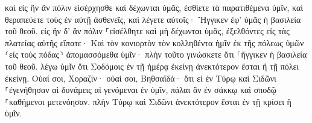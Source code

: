 \documentclass{openreader}
\begin{document}
καὶ εἰς ἣν ἂν πόλιν εἰσέρχησθε καὶ δέχωνται ὑμᾶς, ἐσθίετε τὰ παρατιθέμενα ὑμῖν, 
καὶ θεραπεύετε τοὺς ἐν αὐτῇ ἀσθενεῖς, καὶ λέγετε αὐτοῖς· Ἤγγικεν ἐφ’ ὑμᾶς ἡ βασιλεία τοῦ θεοῦ. 
εἰς ἣν δ’ ἂν πόλιν ⸀εἰσέλθητε καὶ μὴ δέχωνται ὑμᾶς, ἐξελθόντες εἰς τὰς πλατείας αὐτῆς εἴπατε· 
Καὶ τὸν κονιορτὸν τὸν κολληθέντα ἡμῖν ἐκ τῆς πόλεως ὑμῶν ⸂εἰς τοὺς πόδας⸃ ἀπομασσόμεθα ὑμῖν· πλὴν τοῦτο γινώσκετε ὅτι ⸀ἤγγικεν ἡ βασιλεία τοῦ θεοῦ. 
λέγω ὑμῖν ὅτι Σοδόμοις ἐν τῇ ἡμέρᾳ ἐκείνῃ ἀνεκτότερον ἔσται ἢ τῇ πόλει ἐκείνῃ. 
Οὐαί σοι, Χοραζίν· οὐαί σοι, Βηθσαϊδά· ὅτι εἰ ἐν Τύρῳ καὶ Σιδῶνι ⸀ἐγενήθησαν αἱ δυνάμεις αἱ γενόμεναι ἐν ὑμῖν, πάλαι ἂν ἐν σάκκῳ καὶ σποδῷ ⸀καθήμενοι μετενόησαν. 
πλὴν Τύρῳ καὶ Σιδῶνι ἀνεκτότερον ἔσται ἐν τῇ κρίσει ἢ ὑμῖν. 
\end{document}
